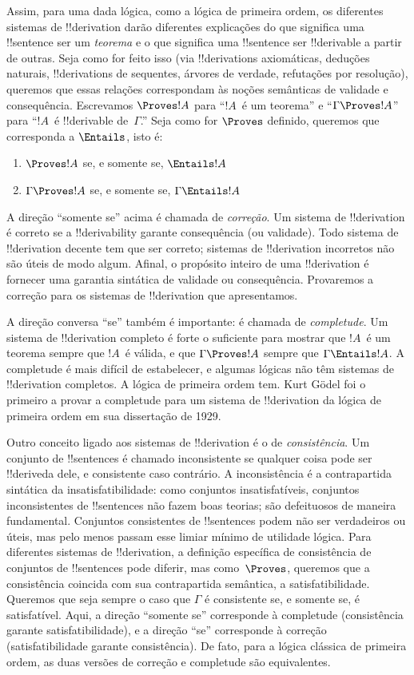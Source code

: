 \documentclass[../../../include/open-logic-section]{subfiles}
\begin{document}
Assim, para uma dada lógica, como a lógica de primeira ordem, os
diferentes sistemas de !!{derivation} darão diferentes explicações do
que significa uma !!{sentence} ser um \emph{teorema} e o que significa
uma !!{sentence} ser !!{derivable} a partir de outras. Seja como for
feito isso (via !!{derivation}s axiomáticas, deduções naturais,
!!{derivation}s de sequentes, árvores de verdade, refutações por
resolução), queremos que essas relações correspondam às noções
semânticas de validade e consequência. Escrevamos $\Proves !A$ para
``$!A$~é um teorema'' e ``$\Gamma \Proves !A$'' para ``$!A$~é
!!{derivable} de~$\Gamma$.'' Seja como for $\Proves$ definido,
queremos que corresponda a $\Entails$, isto é:
\begin{enumerate}
\item $\Proves !A$ se, e somente se, $\Entails !A$
\item $\Gamma \Proves !A$ se, e somente se, $\Gamma \Entails !A$
\end{enumerate}
A direção ``somente se'' acima é chamada de \emph{correção}. Um
sistema de !!{derivation} é correto se a !!{derivability} garante
consequência (ou validade). Todo sistema de !!{derivation} decente tem
que ser correto; sistemas de !!{derivation} incorretos não são úteis de
modo algum. Afinal, o propósito inteiro de uma !!{derivation} é
fornecer uma garantia sintática de validade ou consequência. Provaremos
a correção para os sistemas de !!{derivation} que apresentamos.

A direção conversa ``se'' também é importante: é chamada de
\emph{completude}. Um sistema de !!{derivation} completo é forte o
suficiente para mostrar que $!A$~é um teorema sempre que $!A$~é válida,
e que $\Gamma \Proves !A$ sempre que $\Gamma \Entails !A$.
A completude é mais difícil de estabelecer, e algumas lógicas não têm
sistemas de !!{derivation} completos. A lógica de primeira ordem tem.
Kurt G\"odel foi o primeiro a provar a completude para um sistema de
!!{derivation} da lógica de primeira ordem em sua dissertação de 1929.

Outro conceito ligado aos sistemas de !!{derivation} é o de
\emph{consistência}. Um conjunto de !!{sentence}s é chamado inconsistente
se qualquer coisa pode ser !!{derive}da dele, e consistente caso
contrário.  A inconsistência é a contrapartida sintática da
insatisfatibilidade: como conjuntos insatisfatíveis, conjuntos
inconsistentes de !!{sentence}s não fazem boas teorias; são defeituosos
de maneira fundamental. Conjuntos consistentes de !!{sentence}s podem
não ser verdadeiros ou úteis, mas pelo menos passam esse limiar mínimo
de utilidade lógica.  Para diferentes sistemas de !!{derivation}, a
definição específica de consistência de conjuntos de !!{sentence}s pode
diferir, mas como~$\Proves$, queremos que a consistência coincida com
sua contrapartida semântica, a satisfatibilidade. Queremos que seja
sempre o caso que $\Gamma$ é consistente se, e somente se, é
satisfatível. Aqui, a direção ``somente se'' corresponde à completude
(consistência garante satisfatibilidade), e a direção ``se''
corresponde à correção (satisfatibilidade garante consistência).  De
fato, para a lógica clássica de primeira ordem, as duas versões de
correção e completude são equivalentes.
\end{document}
